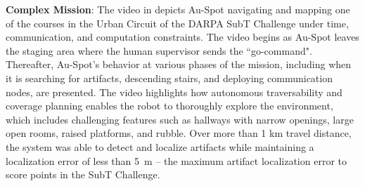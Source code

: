 \documentclass[letterpaper, 10pt, conference]{ieeeconf}      %
\newcommand{\ph}[1]{{\textbf{#1}:}} %
\begin{document}
\ph{Complex Mission}
The video in \cite{spot_urban_video} depicts Au-Spot navigating and mapping one of the courses in the Urban Circuit of the DARPA SubT Challenge under time, communication, and computation constraints. The video begins as Au-Spot leaves the staging area where the human supervisor sends the ``go-command". Thereafter, Au-Spot's behavior at various phases of the mission, including when it is searching for artifacts, descending stairs, and deploying communication nodes, are presented. 
The video highlights how autonomous traversability and coverage planning enables the robot to thoroughly explore the environment, which includes challenging features such as hallways with narrow openings, large open rooms, raised platforms, and rubble. Over more than 1 km travel distance, the system was able to detect and localize artifacts while maintaining a localization error of less than 5~m -- the maximum artifact localization error to score points in the SubT Challenge.



\end{document}
